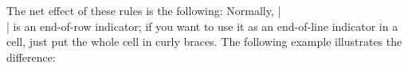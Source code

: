 The net effect of these rules is the following: Normally, |\\| is an
end-of-row indicator; if you want to use it as an end-of-line
indicator in a cell, just put the whole cell in curly braces. The
following example illustrates the difference:
\begin{codeexample}[]
\end{codeexample}
\begin{codeexample}[]
\end{codeexample}

